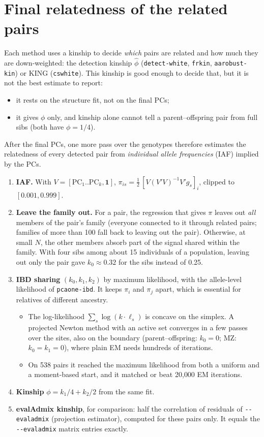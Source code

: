 \documentclass[11pt,a4paper]{article}
\newcommand{\opt}[1]{\texttt{-{}-#1}}
\begin{document}
\clearpage
\section{Final relatedness of the related pairs}
\label{sec:finalrel}

Each method uses a kinship to decide \emph{which} pairs are related and how
much they are down-weighted: the detection kinship $\hat\phi$
(\texttt{detect-white}, \texttt{frkin}, \texttt{aarobust-kin}) or KING
(\texttt{cswhite}). This kinship is good enough to decide that, but it is not
the best estimate to report:
\begin{itemize}
  \item it rests on the structure fit, not on the final PCs;
  \item it gives $\phi$ only, and kinship alone cannot tell a
    parent--offspring pair from full sibs (both have $\phi=1/4$).
\end{itemize}
After the final PCs, one more pass over the genotypes therefore estimates the
relatedness of every detected pair from \emph{individual allele frequencies}
(IAF) implied by the PCs.
\begin{enumerate}
  \item \textbf{IAF.} With $V=[\mathrm{PC}_1..\mathrm{PC}_k,\mathbf 1]$,
    $\pi_{is}=\tfrac12\,[V(V'V)^{-1}V'g_s]_i$, clipped to $[0.001,0.999]$.
  \item \textbf{Leave the family out.} For a pair, the regression that gives
    $\pi$ leaves out \emph{all} members of the pair's family (everyone
    connected to it through related pairs; families of more than 100 fall
    back to leaving out the pair). Otherwise, at small $N$, the other members
    absorb part of the signal shared within the family. With four sibs among
    about 15 individuals of a population, leaving out only the pair gave
    $k_0\approx0.32$ for the sibs instead of 0.25.
  \item \textbf{IBD sharing} $(k_0,k_1,k_2)$ by maximum likelihood, with the
    allele-level likelihood of \texttt{pcaone-ibd}. It keeps $\pi_i$ and
    $\pi_j$ apart, which is essential for relatives of different ancestry.
    \begin{itemize}
      \item The log-likelihood $\sum_s\log(k\cdot\ell_s)$ is concave on the
        simplex. A projected Newton method with an active set converges in a
        few passes over the sites, also on the boundary (parent--offspring:
        $k_0=0$; MZ: $k_0=k_1=0$), where plain EM needs hundreds of iterations.
      \item On 538 pairs it reached the maximum likelihood from both a
        uniform and a moment-based start, and it matched or beat 20{,}000 EM
        iterations.
    \end{itemize}
  \item \textbf{Kinship} $\phi=k_1/4+k_2/2$ from the same fit.
  \item \textbf{evalAdmix kinship}, for comparison: half the correlation of
    residuals of \opt{evaladmix} (projection estimator), computed for these
    pairs only. It equals the \opt{evaladmix} matrix entries exactly.
\end{enumerate}
\end{document}
